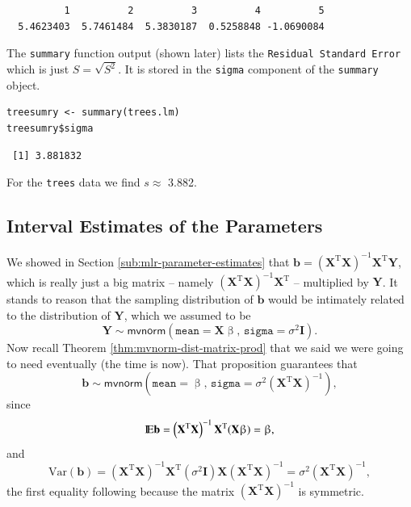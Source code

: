 \documentclass[captions=tableheading]{scrbook}
\begin{document}
\begin{verbatim}
          1          2          3          4          5 
  5.4623403  5.7461484  5.3830187  0.5258848 -1.0690084
\end{verbatim}

The \texttt{summary} function output (shown later) lists the \texttt{Residual Standard Error} which is just $S=\sqrt{S^{2}}$. It is stored in the \texttt{sigma} component of the \texttt{summary} object.


\begin{verbatim}
treesumry <- summary(trees.lm)
treesumry$sigma
\end{verbatim}

\begin{verbatim}
 [1] 3.881832
\end{verbatim}

For the \texttt{trees} data we find $s\approx$  3.882.
\subsection{Interval Estimates of the Parameters}
\label{sec-1-2-4}

\label{sub:mlr-interval-est-params}

We showed in Section \ref{sub:mlr-parameter-estimates} that $\mathbf{b}=\left(\mathbf{X}^{\mathrm{T}}\mathbf{X}\right)^{-1}\mathbf{X}^{\mathrm{T}}\mathbf{Y}$, which is really just a big matrix -- namely $\left(\mathbf{X}^{\mathrm{T}}\mathbf{X}\right)^{-1}\mathbf{X}^{\mathrm{T}}$ -- multiplied by $\mathbf{Y}$. It stands to reason that the sampling distribution of $\mathbf{b}$ would be intimately related to the distribution of $\mathbf{Y}$, which we assumed to be
\begin{equation}
\mathbf{Y}\sim\mathsf{mvnorm}\left(\mathtt{mean}=\mathbf{X}\upbeta,\,\mathtt{sigma}=\sigma^{2}\mathbf{I}\right).
\end{equation}
Now recall Theorem \ref{thm:mvnorm-dist-matrix-prod} that we said we were going to need eventually (the time is now). That proposition guarantees that
\begin{equation}
\mathbf{b}\sim\mathsf{mvnorm}\left(\mathtt{mean}=\upbeta,\,\mathtt{sigma}=\sigma^{2}\left(\mathbf{X}^{\mathrm{T}}\mathbf{X}\right)^{-1}\right),\label{eq:distn-b-mlr}
\end{equation}
since
\begin{equation}
\mathrm{I\hspace{-1.5pt}E}\mathbf{b}=\left(\mathbf{X}^{\mathrm{T}}\mathbf{X}\right)^{-1}\mathbf{X}^{\mathrm{T}}(\mathbf{X}\upbeta)=\upbeta,
\end{equation}
and
\begin{equation}
\mbox{Var}(\mathbf{b})=\left(\mathbf{X}^{\mathrm{T}}\mathbf{X}\right)^{-1}\mathbf{X}^{\mathrm{T}}(\sigma^{2}\mathbf{I})\mathbf{X}\left(\mathbf{X}^{\mathrm{T}}\mathbf{X}\right)^{-1}=\sigma^{2}\left(\mathbf{X}^{\mathrm{T}}\mathbf{X}\right)^{-1},
\end{equation}
the first equality following because the matrix $\left(\mathbf{X}^{\mathrm{T}}\mathbf{X}\right)^{-1}$ is symmetric.
\end{document}
